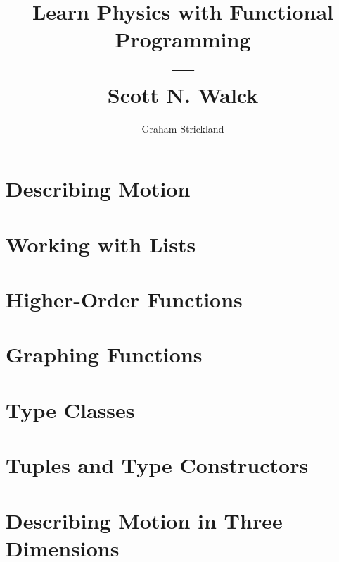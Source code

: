 \documentclass{article}
\title{Learn Physics with Functional Programming\\---\\Scott N. Walck}
\author{Graham Strickland}
\numberwithin{figure}{section}
\numberwithin{table}{section}
\numberwithin{equation}{section}
\begin{document}
\maketitle  

\setcounter{section}{3}
\section{Describing Motion}


\section{Working with Lists}


\section{Higher-Order Functions}


\section{Graphing Functions}


\section{Type Classes}


\section{Tuples and Type Constructors}


\section{Describing Motion in Three Dimensions}

\end{document}
